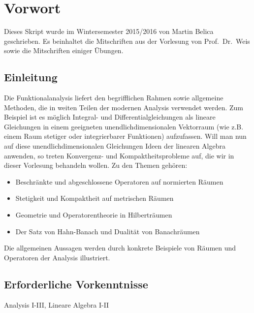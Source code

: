 
\chapter*{Vorwort}
Dieses Skript wurde im Wintersemester 2015/2016
von Martin Belica geschrieben. Es beinhaltet die Mitschriften aus
der Vorlesung von Prof.~Dr.~Weis sowie die Mitschriften einiger
Übungen.


\section*{Einleitung}

Die Funktionalanalysis liefert den begrifflichen Rahmen sowie allgemeine Methoden, die in weiten Teilen der modernen Analysis verwendet werden. Zum Beispiel ist es möglich Integral- und Differentialgleichungen als lineare Gleichungen in einem geeigneten unendlichdimensionalen Vektorraum (wie z.B. einem Raum stetiger oder integrierbarer Funktionen) aufzufassen. Will man nun auf diese unendlichdimensionalen Gleichungen Ideen der linearen Algebra anwenden, so treten Konvergenz- und Kompaktheitsprobleme auf, die wir in dieser Vorlesung behandeln wollen. Zu den Themen gehören:

  \begin{itemize}
     \item Beschränkte und abgeschlossene Operatoren auf normierten Räumen
     \item Stetigkeit und Kompaktheit auf metrischen Räumen
     \item Geometrie und Operatorentheorie in Hilberträumen
     \item Der Satz von Hahn-Banach und Dualität von Banachräumen    
  \end{itemize}
  
Die allgemeinen Aussagen werden durch konkrete Beispiele von Räumen und Operatoren der Analysis illustriert.

\section*{Erforderliche Vorkenntnisse}
Analysis I-III, Lineare Algebra I-II